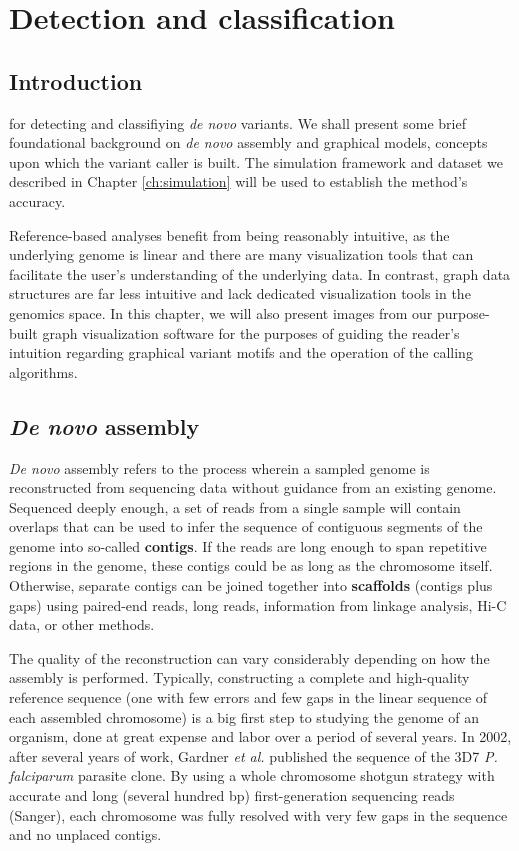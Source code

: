 \chapter{Detection and classification}
\label{ch:methods}

\section{Introduction}

 for detecting and classifiying \textit{de novo} variants.  We shall present some brief foundational background on \textit{de novo} assembly and graphical models, concepts upon which the variant caller is built.  The simulation framework and dataset we described in Chapter \ref{ch:simulation} will be used to establish the method's accuracy.

Reference-based analyses benefit from being reasonably intuitive, as the underlying genome is linear and there are many visualization tools that can facilitate the user's understanding of the underlying data\cite{Li:2009p181,Bao:2009ie,Robinson:2011gy,Milne:2013gf,Thorvaldsdottir:2013iw}.  In contrast, graph data structures are far less intuitive and lack dedicated visualization tools in the genomics space.  In this chapter, we will also present images from our purpose-built graph visualization software for the purposes of guiding the reader's intuition regarding graphical variant motifs and the operation of the calling algorithms.

\section{\textit{De novo} assembly}

\textit{De novo} assembly refers to the process wherein a sampled genome is reconstructed from sequencing data without guidance from an existing genome.  Sequenced deeply enough, a set of reads from a single sample will contain overlaps that can be used to infer the sequence of contiguous segments of the genome into so-called \textbf{contigs}.  If the reads are long enough to span repetitive regions in the genome, these contigs could be as long as the chromosome itself.  Otherwise, separate contigs can be joined together into \textbf{scaffolds} (contigs plus gaps) using paired-end reads, long reads, information from linkage analysis, Hi-C data\cite{Burton:2013dj}, or other methods.

The quality of the reconstruction can vary considerably depending on how the assembly is performed.  Typically, constructing a complete and high-quality reference sequence (one with few errors and few gaps in the linear sequence of each assembled chromosome) is a big first step to studying the genome of an organism, done at great expense and labor over a period of several years.  In 2002, after several years of work, Gardner \textit{et al.} published the sequence of the 3D7 \textit{P. falciparum} parasite clone.  By using a whole chromosome shotgun strategy with accurate and long (several hundred bp) first-generation sequencing reads (Sanger), each chromosome was fully resolved with very few gaps in the sequence and no unplaced contigs\cite{Gardner:2002p1564}.


